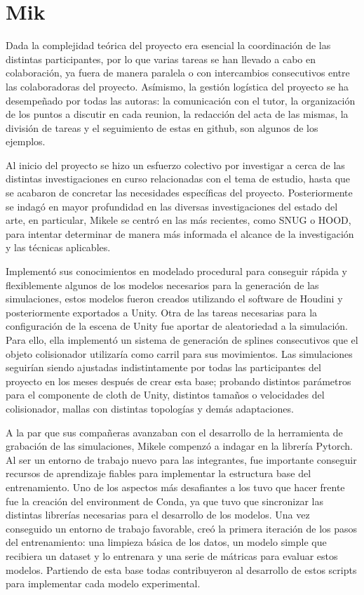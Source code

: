 \newpage
\section*{Mik}
Dada la complejidad teórica del proyecto era esencial la coordinación de las distintas participantes, por lo que varias tareas se han llevado a cabo en colaboración, ya fuera de manera paralela o con intercambios consecutivos entre las colaboradoras del proyecto. Asímismo, la gestión logística del proyecto se ha desempeñado por todas las autoras: la comunicación con el tutor, la organización de los puntos a discutir en cada reunion, la redacción del acta de las mismas, la división de tareas y el seguimiento de estas en github, son algunos de los ejemplos. \newline

Al inicio del proyecto se hizo un esfuerzo colectivo por investigar a cerca de las distintas investigaciones en curso relacionadas con el tema de estudio, hasta que se acabaron de concretar las necesidades específicas del proyecto. Posteriormente se indagó en mayor profundidad en las diversas investigaciones del estado del arte, en particular, Mikele se centró en las más recientes, como SNUG o HOOD, para intentar determinar de manera más informada el alcance de la investigación y las técnicas aplicables. \newline

Implementó sus conocimientos en modelado procedural para conseguir rápida y flexiblemente algunos de los modelos necesarios para la generación de las simulaciones, estos modelos fueron creados utilizando el software de Houdini y posteriormente exportados a Unity. Otra de las tareas necesarias para la configuración de la escena de Unity fue aportar de aleatoriedad a la simulación. Para ello, ella implementó un sistema de generación de splines consecutivos que el objeto colisionador utilizaría como carril para sus movimientos. Las simulaciones seguirían siendo ajustadas indistintamente por todas las participantes del proyecto en los meses después de crear esta base; probando distintos parámetros para el componente de cloth de Unity, distintos tamaños o velocidades del colisionador, mallas con distintas topologías y demás adaptaciones.  \newline

A la par que sus compañeras avanzaban con el desarrollo de la herramienta de grabación de las simulaciones, Mikele compenzó a indagar en la librería Pytorch. Al ser un entorno de trabajo nuevo para las integrantes, fue importante conseguir recursos de aprendizaje fiables para implementar la estructura base del entrenamiento. Uno de los aspectos más desafiantes a los tuvo que hacer frente fue la creación del environment de Conda, ya que tuvo que sincronizar las distintas librerías necesarias para el desarrollo de los modelos. Una vez conseguido un entorno de trabajo favorable, creó la primera iteración de los pasos del entrenamiento: una limpieza básica de los datos, un modelo simple que recibiera un dataset y lo entrenara y una serie de mátricas para evaluar estos modelos. Partiendo de esta base todas contribuyeron al desarrollo de estos scripts para implementar cada modelo experimental. \newline

